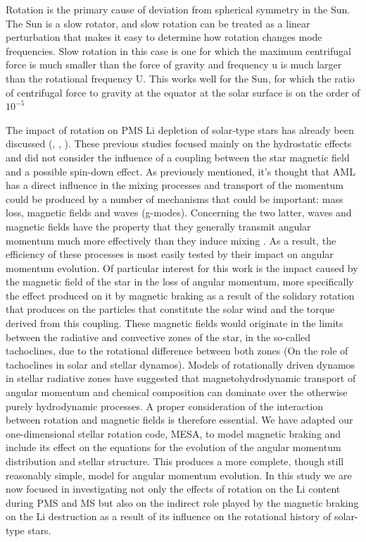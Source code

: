 \documentclass[fleqn,usenatbib]{mnras}
\begin{document}
Rotation is the primary cause of deviation from spherical symmetry in the Sun. The Sun is a slow rotator, and slow rotation can be treated as a linear perturbation that makes it easy to determine how rotation changes mode frequencies. Slow rotation in this case is one for which the maximum centrifugal force is much smaller than the force of gravity and frequency u is much larger than the rotational frequency U. This works well for the Sun, for which the ratio of centrifugal force to gravity at the equator at the solar surface is on the order of $10^{-5}$

The impact of rotation on PMS Li depletion of solar-type stars has already been discussed (\citet{Pinsonneault1997}, \citet{Jeffries2004}, \citet{Somers2014}). These previous studies focused mainly on the hydrostatic effects and did not consider the influence of a coupling between the star magnetic field and a possible spin-down effect. As previously mentioned, it's thought that AML has a direct influence in the mixing processes and transport of the momentum could be produced by a number of mechanisms that could be important: mass loss, magnetic fields and waves (g-modes). Concerning the two latter, waves and magnetic fields have the property that they generally transmit angular momentum much more effectively than they induce mixing  \citep{Denissenkov2007}. As a result, the efficiency of these processes is most easily tested by their impact on angular momentum evolution. Of particular interest for this work is the impact caused by the magnetic field of the star in the loss of angular momentum, more specifically the effect produced on it by magnetic braking as a result of the solidary rotation that produces on the particles that constitute the solar wind and the torque derived from this coupling. These magnetic fields would originate in the limits between the radiative and convective zones of the star, in the so-called tachoclines, due to the rotational difference between both zones \citep{Guerrero2015} (On the role of tachoclines in solar and stellar dynamos). Models of rotationally driven dynamos in stellar radiative zones have suggested that magnetohydrodynamic transport of angular momentum and chemical composition can dominate over the otherwise purely hydrodynamic processes. A proper consideration of the interaction between rotation and magnetic fields is therefore essential. We have adapted our one-dimensional stellar rotation code, MESA, to model magnetic braking and include its effect on the equations for the evolution of the angular momentum distribution and stellar structure. This produces a more complete, though still reasonably simple, model for angular momentum evolution. In this study we are now focused in investigating not only the effects of rotation on the Li content during PMS and MS but also on the indirect role played by the magnetic braking on the Li destruction as a result of its influence on the rotational history of solar-type stars.\par
\end{document}
